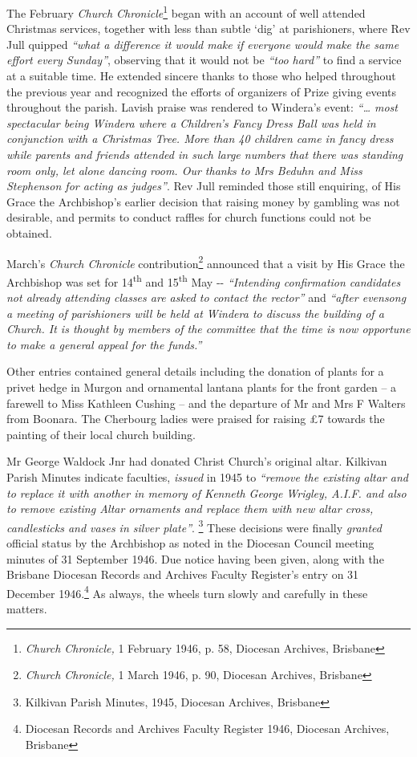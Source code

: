 The February \emph{Church Chronicle}\footnote{\emph{Church Chronicle,} 1 February 1946, p. 58, Diocesan Archives, Brisbane} began with an account of well attended Christmas services, together with less than subtle `dig' at parishioners, where Rev Jull quipped \emph{``what a difference it would make if everyone would make the same effort every Sunday''}, observing that it would not be \emph{``too hard''} to find a service at a suitable time. He extended sincere thanks to those who helped throughout the previous year and recognized the efforts of organizers of Prize giving events throughout the parish. Lavish praise was rendered to Windera's event: \emph{``\ldots{} most spectacular being Windera where a Children's Fancy Dress Ball was held in conjunction with a Christmas Tree. More than 40 children came in fancy dress while parents and friends attended in such large numbers that there was standing room only, let alone dancing room. Our thanks to Mrs Beduhn and Miss Stephenson for acting as judges''}. Rev Jull reminded those still enquiring, of His Grace the Archbishop's earlier decision that raising money by gambling was not desirable, and permits to conduct raffles for church functions could not be obtained.


March's \emph{Church Chronicle} contribution\footnote{\emph{Church Chronicle,} 1 March 1946, p. 90, Diocesan Archives, Brisbane} announced that a visit by His Grace the Archbishop was set for 14\textsuperscript{th} and 15\textsuperscript{th} May -\/- \emph{``Intending confirmation candidates not already attending classes are asked to contact the rector''} and \emph{``after evensong a meeting of parishioners will be held at Windera to discuss the building of a Church. It is thought by members of the committee that the time is now opportune to make a general appeal for the funds.''}


Other entries contained general details including the donation of plants for a privet hedge in Murgon and ornamental lantana plants for the front garden -- a farewell to Miss Kathleen Cushing -- and the departure of Mr and Mrs F Walters from Boonara. The Cherbourg ladies were praised for raising \pounds7 towards the painting of their local church building.



Mr George Waldock Jnr had donated Christ Church's original altar. Kilkivan Parish Minutes indicate faculties, \emph{issued} in 1945 to \emph{``remove the existing altar and to replace it with another in memory of Kenneth George Wrigley, A.I.F. and also to remove existing Altar ornaments and replace them with new altar cross, candlesticks and vases in silver plate''}. \footnote{Kilkivan Parish Minutes, 1945, Diocesan Archives, Brisbane} These decisions were finally \emph{granted} official status by the Archbishop as noted in the Diocesan Council meeting minutes of 31 September 1946. Due notice having been given, along with the Brisbane Diocesan Records and Archives Faculty Register's entry on 31 December 1946.\footnote{Diocesan Records and Archives Faculty Register 1946, Diocesan Archives, Brisbane} As always, the wheels turn slowly and carefully in these matters.


